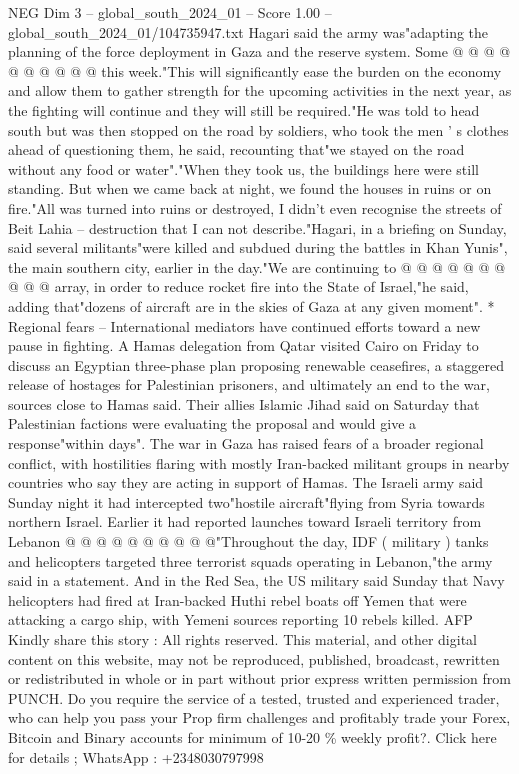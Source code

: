 \begin{textsample}{NEG Dim 3 – global\_south\_2024\_01 – Score 1.00 – global\_south\_2024\_01/104735947.txt}
Hagari said the army was"adapting the planning of the force deployment in Gaza and the reserve system.
Some @ @ @ @ @ @ @ @ @ @ this week."This will significantly ease the burden on the economy and allow them to gather strength for the upcoming activities in the next year, as the fighting will continue and they will still be required."He was told to head south but was then stopped on the road by soldiers, who took the men ' s clothes ahead of questioning them, he said, recounting that"we stayed on the road without any food or water"."When they took us, the buildings here were still standing.
But when we came back at night, we found the houses in ruins or on fire."All was turned into ruins or destroyed, I didn't even recognise the streets of Beit Lahia -- destruction that I can not describe."Hagari, in a briefing on Sunday, said several militants"were killed and subdued during the battles in Khan Yunis", the main southern city, earlier in the day."We are continuing to @ @ @ @ @ @ @ @ @ @ array, in order to reduce rocket fire into the State of Israel,"he said, adding that"dozens of aircraft are in the skies of Gaza at any given moment". * Regional fears -- International mediators have continued efforts toward a new pause in fighting.
A Hamas delegation from Qatar visited Cairo on Friday to discuss an Egyptian three-phase plan proposing renewable ceasefires, a staggered release of hostages for Palestinian prisoners, and ultimately an end to the war, sources close to Hamas said.
Their allies Islamic Jihad said on Saturday that Palestinian factions were evaluating the proposal and would give a response"within days".
The war in Gaza has raised fears of a broader regional conflict, with hostilities flaring with mostly Iran-backed militant groups in nearby countries who say they are acting in support of Hamas.
The Israeli army said Sunday night it had intercepted two"hostile aircraft"flying from Syria towards northern Israel.
Earlier it had reported launches toward Israeli territory from Lebanon @ @ @ @ @ @ @ @ @ @"Throughout the day, IDF ( military ) tanks and helicopters targeted three terrorist squads operating in Lebanon,"the army said in a statement.
And in the Red Sea, the US military said Sunday that Navy helicopters had fired at Iran-backed Huthi rebel boats off Yemen that were attacking a cargo ship, with Yemeni sources reporting 10 rebels killed.
AFP Kindly share this story : All rights reserved.
This material, and other digital content on this website, may not be reproduced, published, broadcast, rewritten or redistributed in whole or in part without prior express written permission from PUNCH.
Do you require the service of a tested, trusted and experienced trader, who can help you pass your Prop firm challenges and profitably trade your Forex, Bitcoin and Binary accounts for minimum of 10-20 \% weekly profit?.
Click here for details ; WhatsApp : +2348030797998

\end{textsample}
